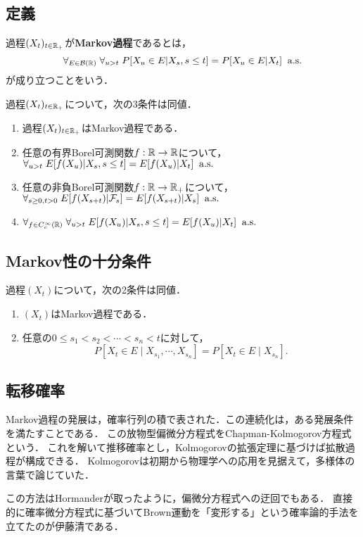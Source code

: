 \documentclass[uplatex,dvipdfmx]{jsreport}
\begin{document}
\subsection{定義}

\begin{definition}
    過程$(X_t)_{t\in\mathbb{R}_+}$が\textbf{Markov過程}であるとは，
    \[\forall_{E\in\mathcal{B}(\mathbb{R})}\;\forall_{u>t}\;P[X_u\in E|X_s,s\le t]=P[X_u\in E|X_t]\;\;\mathrm{a.s.}\]
    が成り立つことをいう．
\end{definition}

\begin{lemma}[Markov性の特徴付け]
    過程$(X_t)_{t\in\mathbb{R}_+}$について，次の3条件は同値．
    \begin{enumerate}
        \item 過程$(X_t)_{t\in\mathbb{R}_+}$はMarkov過程である．
        \item 任意の有界Borel可測関数$f:\mathbb{R}\to\mathbb{R}$について，$\forall_{u>t}\;E[f(X_u)|X_s,s\le t]=E[f(X_u)|X_t]\;\;\mathrm{a.s.}$
        \item 任意の非負Borel可測関数$f:\mathbb{R}\to\mathbb{R}_+$について，$\forall_{s\ge0,t>0}\;E[f(X_{s+t})|\mathcal{F}_s]=E[f(X_{s+t})|X_s]\;\;\mathrm{a.s.}$
        \item $\forall_{f\in C_c^\infty(\mathbb{R})}\;\forall_{u>t}\;E[f(X_u)|X_s,s\le t]=E[f(X_u)|X_t]\;\;\mathrm{a.s.}$
    \end{enumerate}
\end{lemma}

\subsection{Markov性の十分条件}

\begin{theorem}
    過程$(X_t)$について，次の2条件は同値．
    \begin{enumerate}
        \item $(X_t)$はMarkov過程である．
        \item 任意の$0\le s_1<s_2<\cdots<s_n<t$に対して，
        \[P[X_t\in E\mid X_{s_1},\cdots,X_{s_n}]=P[X_t\in E\mid X_{s_n}].\]
    \end{enumerate}
\end{theorem}

\subsection{転移確率}

\begin{tcolorbox}[colframe=ForestGreen, colback=ForestGreen!10!white,breakable,colbacktitle=ForestGreen!40!white,coltitle=black,fonttitle=\bfseries\sffamily,
title=熱核の半群性]
    Markov過程の発展は，確率行列の積で表された．この連続化は，ある発展条件を満たすことである．
    この放物型偏微分方程式をChapman-Kolmogorov方程式という．
    これを解いて推移確率とし，Kolmogorovの拡張定理に基づけば拡散過程が構成できる．
    Kolmogorovは初期から物理学への応用を見据えて，多様体の言葉で論じていた．

    この方法はHormanderが取ったように，偏微分方程式への迂回でもある．
    直接的に確率微分方程式に基づいてBrown運動を「変形する」という確率論的手法を立てたのが伊藤清である．
\end{tcolorbox}
\end{document}
